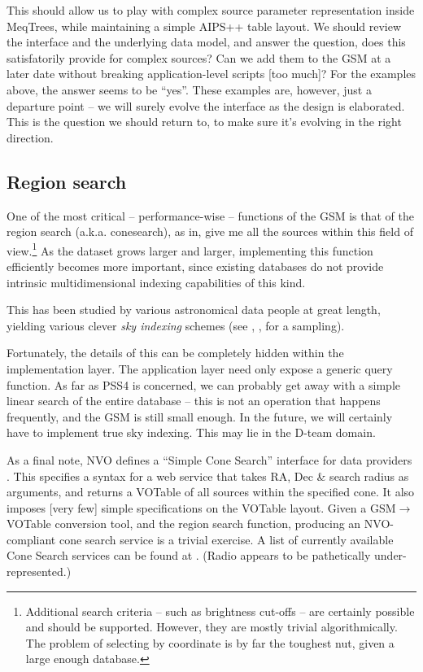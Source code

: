 \documentclass[]{lofar}
\begin{document}
  This should allow us to play with complex source parameter representation
  inside MeqTrees, while maintaining a simple AIPS++ table layout. We should
  review the interface and the underlying data model, and answer the question,
  does this satisfatorily provide for complex sources? Can we add them to the GSM
  at a later date without breaking application-level scripts [too much]? For the
  examples above, the answer seems to be ``yes''. These examples are, however,
  just a departure point -- we will surely evolve the interface as the design is
  elaborated. This is the question we should return to, to make sure it's
  evolving in the right direction.
  
\subsection{Region search}
  
  One of the most critical -- performance-wise -- functions of the GSM is that of
  the region search (a.k.a. conesearch), as in, give me all the sources within
  this field of view.\footnote{Additional search criteria -- such as brightness
  cut-offs -- are certainly possible and should be supported. However, they are
  mostly trivial algorithmically. The problem of selecting by coordinate is by
  far the toughest nut, given a large enough database.} As the dataset grows
  larger and larger, implementing this function efficiently becomes more
  important, since existing databases do not provide intrinsic multidimensional
  indexing capabilities of this kind. 
  
  This has been studied by various astronomical data people at great
  length, yielding various clever {\em sky indexing} schemes (see \cite{SI1},
  \cite{SI2}, \cite{SI3} for a sampling).
  
  Fortunately, the details of this can be completely hidden within the
  implementation layer. The application layer need only expose a generic query
  function. As far as PSS4 is concerned, we can probably get away with a simple
  linear search of the entire database -- this is not an operation that happens
  frequently, and the GSM is still small enough. In the future, we will
  certainly have to implement true sky indexing. This may lie in the D-team
  domain.
  
  As a final note, NVO defines a ``Simple Cone Search'' interface for data
  providers \cite{CS1}. This specifies a syntax for a web service that takes RA,
  Dec \& search radius as arguments, and returns a VOTable of all sources within
  the specified cone. It also imposes [very few] simple specifications on the
  VOTable layout. Given a GSM$\rightarrow$VOTable conversion tool, and the region
  search function, producing an NVO-compliant cone search service is a trivial
  exercise. A list of currently available Cone Search services can be found at
  \cite{CS2}. (Radio appears to be pathetically under-represented.)
  
\end{document}
